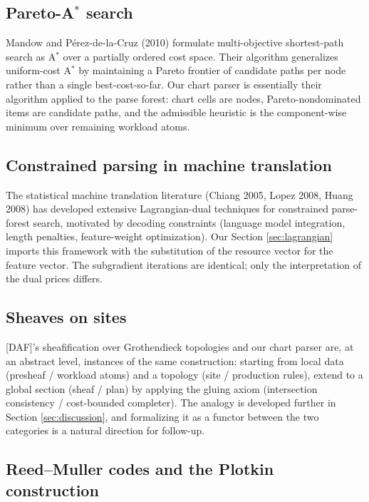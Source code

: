 \subsection{Pareto-A$^*$ search}

Mandow and P\'{e}rez-de-la-Cruz (2010) formulate
multi-objective shortest-path search as A$^*$ over a
partially ordered cost space. Their algorithm
generalizes uniform-cost A$^*$ by maintaining a
Pareto frontier of candidate paths per node rather
than a single best-cost-so-far. Our chart parser is
essentially their algorithm applied to the parse
forest: chart cells are nodes, Pareto-nondominated
items are candidate paths, and the admissible
heuristic is the component-wise minimum over
remaining workload atoms.

\subsection{Constrained parsing in machine translation}

The statistical machine translation literature
(Chiang 2005, Lopez 2008, Huang 2008) has developed
extensive Lagrangian-dual techniques for constrained
parse-forest search, motivated by decoding
constraints (language model integration, length
penalties, feature-weight optimization). Our
Section \ref{sec:lagrangian} imports this framework
with the substitution of the resource vector for
the feature vector. The subgradient iterations are
identical; only the interpretation of the dual
prices differs.

\subsection{Sheaves on sites}

[DAF]'s sheafification over Grothendieck topologies
and our chart parser are, at an abstract level,
instances of the same construction: starting from
local data (presheaf / workload atoms) and a
topology (site / production rules), extend to a
global section (sheaf / plan) by applying the
gluing axiom (intersection consistency /
cost-bounded completer). The analogy is developed
further in Section \ref{sec:discussion}, and
formalizing it as a functor between the two
categories is a natural direction for follow-up.

\subsection{Reed--Muller codes and the Plotkin construction}

